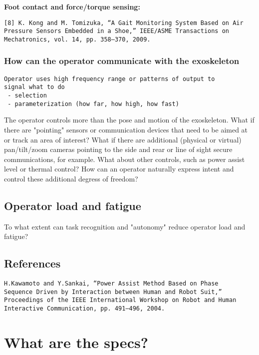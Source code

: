 \documentclass[letterpaper,12pt,fullpage]{article}
\begin{document}
{\bf Foot contact and force/torque sensing:}
\begin{verbatim}
[8] K. Kong and M. Tomizuka, “A Gait Monitoring System Based on Air
Pressure Sensors Embedded in a Shoe,” IEEE/ASME Transactions on
Mechatronics, vol. 14, pp. 358–370, 2009.
\end{verbatim}

\subsubsection{How can the operator communicate with the exoskeleton}

\begin{verbatim}
Operator uses high frequency range or patterns of output to
signal what to do
 - selection
 - parameterization (how far, how high, how fast)
\end{verbatim}

The operator controls more than the pose and motion of the
exoskeleton. What if there are "pointing" sensors or communication
devices that need to be aimed at or track an area of interest? What if
there are additional (physical or virtual) pan/tilt/zoom cameras
pointing to the side and rear or line of sight secure communications,
for example. What about other controls, such as power assist level or
thermal control? How can an operator naturally express intent and
control these additional degress of freedom?

\subsection{Operator load and fatigue}

To what extent can task recognition and "autonomy" reduce operator
load and fatigue?

\subsection{References}

\begin{verbatim}
H.Kawamoto and Y.Sankai, “Power Assist Method Based on Phase
Sequence Driven by Interaction between Human and Robot Suit,”
Proceedings of the IEEE International Workshop on Robot and Human
Interactive Communication, pp. 491–496, 2004.
\end{verbatim}

\section{What are the specs?}
\end{document}
